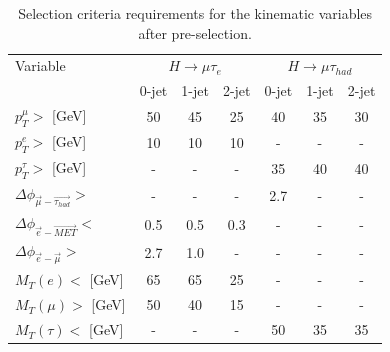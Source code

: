 \documentclass[oneside, letterpaper, oldfontcommands]{memoir}
\begin{document}
{{{\begin{table}[hbtp]
 \begin{center}
 \caption{Selection criteria requirements for the kinematic variables after pre-selection.}
  \label{tab:kinematicselection}
  \vspace{0.1in}
  \begin{tabular}{|l|c|c|c|c|c|c|} \hline
Variable                                      & \multicolumn{3}{c|}{$H \to \mu \tau_{e}$}                 &     \multicolumn{3}{c|}{$H \to \mu \tau_{had}$}     \\ \cline{2-7}
                                              &  0-jet        & 1-jet       & 2-jet         &  0-jet         & 1-jet       & 2-jet  \\ \hline \hline
$p^{\mu}_{T}>$ [GeV]                          &     50        &   45        &   25          &  40            & 35          &  30    \\  \hline
$p^{e}_{T}>$   [GeV]                          &     10        &   10        &   10          &   -            &  -          &  -      \\  \hline
$p^{\tau}_{T}>$ [GeV]                         &     -         &    -        &    -          &  35            & 40          &  40    \\  \hline
$\Delta \phi_{\vec{\mu}-\vec{\tau_{had}}}>$   &     -         &    -        &    -          &  2.7           &  -          &  -      \\  \hline
$\Delta \phi_{\vec{e} - \vec{MET}}<$             &    0.5        &   0.5       &   0.3         &    -           &  -          &  -      \\  \hline
$\Delta \phi_{\vec{e} - \vec{\mu}}>$            &    2.7        &   1.0       &    -          &    -           &   -         &  -      \\  \hline    
$M_{T}(e)<$ [GeV]                             &    65         &   65        &   25          &    -           &   -         &  -      \\  \hline    
$M_{T}(\mu)>$ [GeV]                           &    50         &   40        &   15          &    -           &   -         &  -      \\  \hline    
$M_{T}(\tau)<$ [GeV]                          &     -         &    -        &    -           &  50            & 35          &   35   \\   \hline   
  \end{tabular}
 \end{center}
\end{table}


}}}
\end{document}
